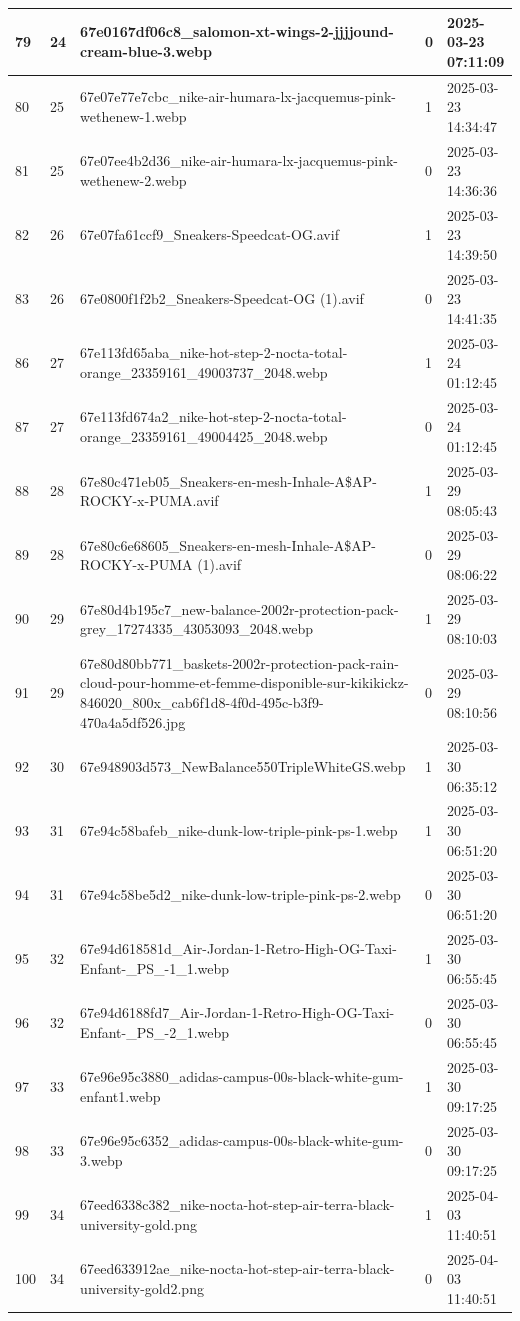 \begin{longtable}{|l|l|l|l|l|}
79 & 24 & 67e0167df06c8\_salomon-xt-wings-2-jjjjound-cream-blue-3.webp & 0 & 2025-03-23 07:11:09 \\ \hline 
80 & 25 & 67e07e77e7cbc\_nike-air-humara-lx-jacquemus-pink-wethenew-1.webp & 1 & 2025-03-23 14:34:47 \\ \hline 
81 & 25 & 67e07ee4b2d36\_nike-air-humara-lx-jacquemus-pink-wethenew-2.webp & 0 & 2025-03-23 14:36:36 \\ \hline 
82 & 26 & 67e07fa61ccf9\_Sneakers-Speedcat-OG.avif & 1 & 2025-03-23 14:39:50 \\ \hline 
83 & 26 & 67e0800f1f2b2\_Sneakers-Speedcat-OG (1).avif & 0 & 2025-03-23 14:41:35 \\ \hline 
86 & 27 & 67e113fd65aba\_nike-hot-step-2-nocta-total-orange\_23359161\_49003737\_2048.webp & 1 & 2025-03-24 01:12:45 \\ \hline 
87 & 27 & 67e113fd674a2\_nike-hot-step-2-nocta-total-orange\_23359161\_49004425\_2048.webp & 0 & 2025-03-24 01:12:45 \\ \hline 
88 & 28 & 67e80c471eb05\_Sneakers-en-mesh-Inhale-A\$AP-ROCKY-x-PUMA.avif & 1 & 2025-03-29 08:05:43 \\ \hline 
89 & 28 & 67e80c6e68605\_Sneakers-en-mesh-Inhale-A\$AP-ROCKY-x-PUMA (1).avif & 0 & 2025-03-29 08:06:22 \\ \hline 
90 & 29 & 67e80d4b195c7\_new-balance-2002r-protection-pack-grey\_17274335\_43053093\_2048.webp & 1 & 2025-03-29 08:10:03 \\ \hline 
91 & 29 & 67e80d80bb771\_baskets-2002r-protection-pack-rain-cloud-pour-homme-et-femme-disponible-sur-kikikickz-846020\_800x\_cab6f1d8-4f0d-495c-b3f9-470a4a5df526.jpg & 0 & 2025-03-29 08:10:56 \\ \hline 
92 & 30 & 67e948903d573\_NewBalance550TripleWhiteGS.webp & 1 & 2025-03-30 06:35:12 \\ \hline 
93 & 31 & 67e94c58bafeb\_nike-dunk-low-triple-pink-ps-1.webp & 1 & 2025-03-30 06:51:20 \\ \hline 
94 & 31 & 67e94c58be5d2\_nike-dunk-low-triple-pink-ps-2.webp & 0 & 2025-03-30 06:51:20 \\ \hline 
95 & 32 & 67e94d618581d\_Air-Jordan-1-Retro-High-OG-Taxi-Enfant-\_PS\_-1\_1.webp & 1 & 2025-03-30 06:55:45 \\ \hline 
96 & 32 & 67e94d6188fd7\_Air-Jordan-1-Retro-High-OG-Taxi-Enfant-\_PS\_-2\_1.webp & 0 & 2025-03-30 06:55:45 \\ \hline 
97 & 33 & 67e96e95c3880\_adidas-campus-00s-black-white-gum-enfant1.webp & 1 & 2025-03-30 09:17:25 \\ \hline 
98 & 33 & 67e96e95c6352\_adidas-campus-00s-black-white-gum-3.webp & 0 & 2025-03-30 09:17:25 \\ \hline 
99 & 34 & 67eed6338c382\_nike-nocta-hot-step-air-terra-black-university-gold.png & 1 & 2025-04-03 11:40:51 \\ \hline 
100 & 34 & 67eed633912ae\_nike-nocta-hot-step-air-terra-black-university-gold2.png & 0 & 2025-04-03 11:40:51 \\ \hline 
 \end{longtable}

